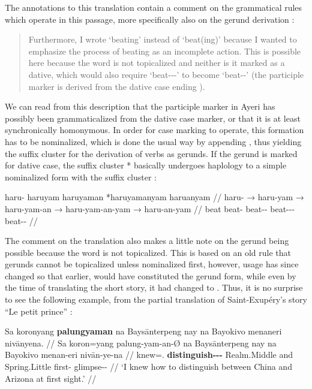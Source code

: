 The annotations to this translation contain a comment on the grammatical 
rules which operate in this passage, more specifically also on the gerund 
derivation :

\blockcquote[14--15]{becker:kafka:imperial}{Furthermore, I wrote 
 `beating' instead of  `beat(ing)' because I wanted to 
emphasize the process of beating as an incomplete action. This is possible here 
because the word is not topicalized and neither is it marked as a dative, which 
would also require  `beat-\Ptcp{}-\Nmlz{}-\Dat{}' to become 
 `beat-\Nmlz{}-\Dat{}' (the participle marker  is 
derived from the dative case ending ).}

We can read from this description that the participle marker in Ayeri has 
possibly been grammaticalized from the dative case marker, or that it is at 
least synchronically homonymous. In order for case marking to operate, this 
formation has to be nominalized, which is done the usual way by appending 
, thus yielding the suffix cluster  for the 
derivation of verbs as gerunds. If the gerund is marked for dative case, the 
suffix cluster * basically undergoes haplology to 
a simple nominalized form with the suffix cluster :

\ex\begingl
	\gla haru- {} haruyam {} haruyaman {} *haruyamanyam {} haruanyam //
	\glb haru- → haru-yam → haru-yam-an → haru-yam-an-yam → 
		haru-an-yam //
	\glc beat {} beat-\Ptcp{} {} beat-\Ptcp{}-\Nmlz{} {} 
		beat-\Ptcp{}-\Nmlz{}-\Dat{} {} beat-\Nmlz{}-\Dat{} //
\endgl\xe

The comment on the translation also makes a little note on the gerund being 
possible because the word is not topicalized. This is based on an old rule that 
gerunds cannot be topicalized unless nominalized first, however, usage has 
since changed so that earlier,  would have constituted 
the gerund form, while even by the time of translating the short story, it had 
changed to . Thus, it is no surprise to see the 
following example, from the partial translation of Saint-Exupéry's story 
\enquote{Le petit prince} \citep[3, 13]{benung:petitprince}:

\ex\label{ex:exuperygerund}\begingl
	\gla Sa koronyang \textbf{palungyaman} na Baysānterpeng nay na Bayokivo 
		menaneri nivānyena. //
	\glb Sa koron=yang palung-yam-an-Ø na Baysānterpeng nay na 
		Bayokivo menan-eri nivān-ye-na //
	\glc \PatT{} knew=\Fsg{}.\Aarg{} 
		\textbf{distinguish-\Ptcp{}-\Nmlz{}-\Top{}} \Gen{} Realm.Middle 
		and \Gen{} Spring.Little first-\Ins{} glimpse-\Pl{}-\Gen{} //
	\glft `I knew how to distinguish between China and Arizona at first 
		sight.' //
\endgl\xe

